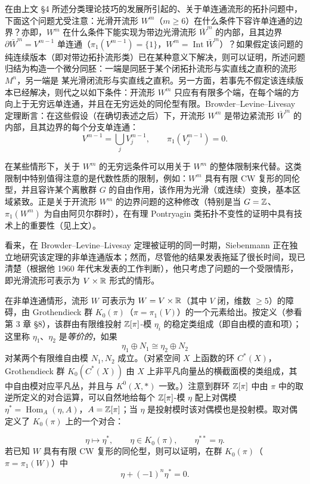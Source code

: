 在由上文 §4 所述分类理论技巧的发展所引起的、关于单连通流形的拓扑问题中，下面这个问题尤受注意：光滑开流形 $W^{m}$（$m\ge 6$）在什么条件下容许单连通的边界？亦即，$W^{m}$ 在什么条件下能实现为带边光滑流形 $\bar W^{m}$ 的内部，且其边界 $\partial\bar W^{m}=V^{m-1}$ 单连通（$\pi_{1}(V^{m-1})=\{1\}$，$W^{m}=\operatorname{Int}\bar W^{m}$）？如果假定该问题的纯连续版本（即对带边拓扑流形类）已在某种意义下解决，则可以证明，所述问题归结为构造一个微分同胚：一端是同胚于某个闭拓扑流形与实直线之直积的流形 $M^{n}$，另一端是
某光滑闭流形与实直线之直积。另一方面，若事先不假定该连续版本已经解决，则代之以如下条件：开流形 $W^{m}$ 只应有有限多个端，在每个端的方向上于无穷远单连通，并且在无穷远处的同伦型有限。Browder--Levine--Livesay 定理断言：在这些假设（在确切表述之后）下，开流形 $W^{m}$ 是带边紧流形 $\bar W^{m}$ 的内部，且其边界的每个分支单连通：
\[
V^{m-1}=\bigcup_{j}V_{j}^{m-1},\qquad \pi_{1}(V_{j}^{m-1})=0.
\]

在某些情形下，关于 $W^{m}$ 的无穷远条件可以用关于 $W^{m}$ 的整体限制来代替。这类限制中特别值得注意的是代数性质的限制，例如：$W^{m}$ 具有有限 CW 复形的同伦型，并且容许某个离散群 $G$ 的自由作用，该作用为光滑（或连续）变换，基本区域紧致。正是关于开流形 $W^{m}$ 的边界问题的这种修改（特别是当 $G=\mathbb{Z}$、$\pi_{1}(W^{m})$ 为自由阿贝尔群时），在有理 Pontryagin 类拓扑不变性的证明中具有技术上的重要性（见上文）。

看来，在 Browder--Levine--Livesay 定理被证明的同一时期，Siebenmann 正在独立地研究该定理的非单连通版本；然而，尽管他的结果发表拖延了很长时间，现已清楚（根据他 1960 年代末发表的工作判断），他只考虑了问题的一个受限情形，即光滑流形可表示为 $V\times\mathbb{R}$ 形式的情形。

在非单连通情形，流形 $W$ 可表示为 $W=V\times\mathbb{R}$（其中 $V$ 闭，维数 $\ge 5$）的障碍，由 Grothendieck 群 $K_{0}(\pi)$（$\pi=\pi_{1}(V)$）的一个元素给出。按定义（参看第 3 章 §8），该群由有限维投射 $\mathbb{Z}[\pi]$-模 $\eta_{i}$ 的稳定类组成（即自由模的直和项）；这里称 $\eta_{1}$、$\eta_{2}$ 是\emph{等价的}，如果
\[
\eta_{1}\oplus N_{1}\cong\eta_{2}\oplus N_{2}
\]
对某两个有限维自由模 $N_{1},N_{2}$ 成立。（对紧空间 $X$ 上函数的环 $C^{*}(X)$，Grothendieck 群 $K_{0}(C^{*}(X))$ 由 $X$ 上非平凡向量丛的横截面模的类组成，其中自由模对应平凡丛，并且与 $K^{0}(X,*)$ 一致。）注意到群环 $\mathbb{Z}[\pi]$ 中由 $\pi$ 中的取逆所定义的对合运算，可以自然地给每个 $\mathbb{Z}[\pi]$-模 $\eta$ 配上对偶模 $\eta^{*}=\operatorname{Hom}_{A}(\eta,A)$，$A=\mathbb{Z}[\pi]$；当 $\eta$ 是投射模时该对偶模也是投射模。取对偶定义了 $K_{0}(\pi)$ 上的一个对合：

\[
\eta\mapsto\eta^{*},\qquad \eta\in K_{0}(\pi),\qquad \eta^{\ast\ast}=\eta.
\]
若已知 $W$ 具有有限 CW 复形的同伦型，则可以证明，在群 $K_{0}(\pi)$（$\pi=\pi_{1}(W)$）中
\[
\eta+(-1)^{n}\eta^{*}=0.
\]

